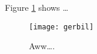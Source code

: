 \documentclass{article}
\begin{document}
Figure \ref{fig:gerbil} shows \ldots
\begin{figure}
\centering
\texttt{[image: gerbil]}
\caption{\label{fig:gerbil}Aww\ldots.}
\end{figure}
\end{document}
